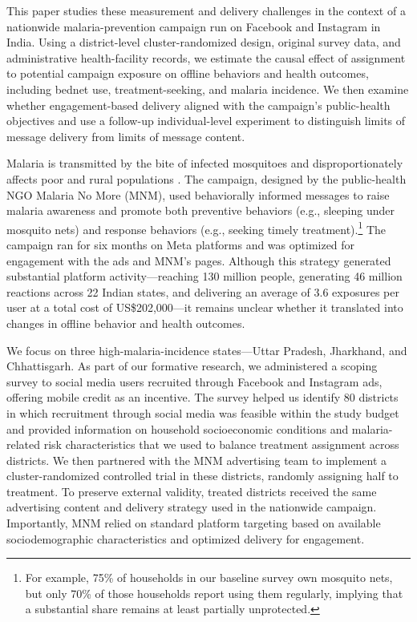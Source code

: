 This paper studies these measurement and delivery challenges in the context of a nationwide malaria-prevention campaign run on Facebook and Instagram in India. Using a district-level cluster-randomized design, original survey data, and administrative health-facility records, we estimate the causal effect of assignment to potential campaign exposure on offline behaviors and health outcomes, including bednet use, treatment-seeking, and malaria incidence. We then examine whether engagement-based delivery aligned with the campaign’s public-health objectives and use a follow-up individual-level experiment to distinguish limits of message delivery from limits of message content.

Malaria is transmitted by the bite of infected mosquitoes and disproportionately affects poor and rural populations \citep{dev2004physiographic}. The campaign, designed by the public-health NGO Malaria No More (MNM), used behaviorally informed messages to raise malaria awareness and promote both preventive behaviors (e.g., sleeping under mosquito nets) and response behaviors (e.g., seeking timely treatment).\footnote{For example, 75\% of households in our baseline survey own mosquito nets, but only 70\% of those households report using them regularly, implying that a substantial share remains at least partially unprotected.} The campaign ran for six months on Meta platforms and was optimized for engagement with the ads and MNM’s pages. Although this strategy generated substantial platform activity---reaching 130 million people, generating 46 million reactions across 22 Indian states, and delivering an average of 3.6 exposures per user at a total cost of US\$202{,}000---it remains unclear whether it translated into changes in offline behavior and health outcomes.



We focus on three high-malaria-incidence states---Uttar Pradesh, Jharkhand, and Chhattisgarh. As part of our formative research, we administered a scoping survey to social media users recruited through Facebook and Instagram ads, offering mobile credit as an incentive. The survey helped us identify 80 districts in which recruitment through social media was feasible within the study budget and provided information on household socioeconomic conditions and malaria-related risk characteristics that we used to balance treatment assignment across districts. We then partnered with the MNM advertising team to implement a cluster-randomized controlled trial in these districts, randomly assigning half to treatment. To preserve external validity, treated districts received the same advertising content and delivery strategy used in the nationwide campaign. Importantly, MNM relied on standard platform targeting based on available sociodemographic characteristics and optimized delivery for engagement. 


